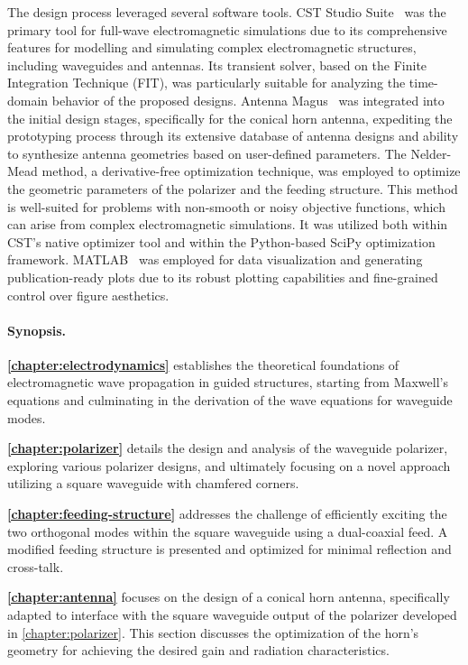 \documentclass[14pt,a4paper]{ntust_report}
\begin{document}
The design process leveraged several software tools. CST Studio Suite~\parencite{cst} was the primary tool for full-wave electromagnetic simulations due to its comprehensive features for modelling and simulating complex electromagnetic structures, including waveguides and antennas. Its transient solver, based on the Finite Integration Technique (FIT), was particularly suitable for analyzing the time-domain behavior of the proposed designs. Antenna Magus~\parencite{antenna-magus} was integrated into the initial design stages, specifically for the conical horn antenna, expediting the prototyping process through its extensive database of antenna designs and ability to synthesize antenna geometries based on user-defined parameters. The Nelder-Mead method, a derivative-free optimization technique, was employed to optimize the geometric parameters of the polarizer and the feeding structure. This method is well-suited for problems with non-smooth or noisy objective functions, which can arise from complex electromagnetic simulations. It was utilized both within CST's native optimizer tool and within the Python-based SciPy optimization framework. MATLAB~\parencite{matlab} was employed for data visualization and generating publication-ready plots due to its robust plotting capabilities and fine-grained control over figure aesthetics.

\paragraph*{Synopsis.} \textbf{\cref{chapter:electrodynamics}} establishes the theoretical foundations of electromagnetic wave propagation in guided structures, starting from Maxwell's equations and culminating in the derivation of the wave equations for waveguide modes.

\textbf{\cref{chapter:polarizer}} details the design and analysis of the waveguide polarizer, exploring various polarizer designs, and ultimately focusing on a novel approach utilizing a square waveguide with chamfered corners.

\textbf{\cref{chapter:feeding-structure}} addresses the challenge of efficiently exciting the two orthogonal modes within the square waveguide using a dual-coaxial feed. A modified feeding structure is presented and optimized for minimal reflection and cross-talk.

\textbf{\cref{chapter:antenna}} focuses on the design of a conical horn antenna, specifically adapted to interface with the square waveguide output of the polarizer developed in \cref{chapter:polarizer}. This section discusses the optimization of the horn's geometry for achieving the desired gain and radiation characteristics.
\end{document}
